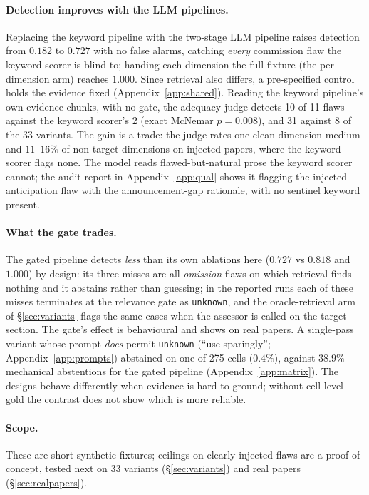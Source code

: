 \paragraph{Detection improves with the LLM pipelines.}
Replacing the keyword pipeline with the two-stage LLM pipeline raises detection
from $0.182$ to $0.727$ with no false alarms, catching \emph{every} commission
flaw the keyword scorer is blind to; handing each dimension the full fixture (the
per-dimension arm) reaches $1.000$. Since retrieval also differs, a
pre-specified control holds the evidence fixed (Appendix~\ref{app:shared}).
Reading the keyword pipeline's own evidence chunks, with no gate, the adequacy
judge detects 10 of 11 flaws against the keyword scorer's 2 (exact McNemar
$p{=}0.008$), and 31 against 8 of the 33 variants. The gain is a trade: the
judge rates one clean dimension medium and $11$--$16\%$ of non-target
dimensions on injected papers, where the keyword scorer flags none. The model reads flawed-but-natural prose the keyword scorer
cannot; the audit report in Appendix~\ref{app:qual} shows it flagging the
injected anticipation flaw with the announcement-gap rationale, with no sentinel
keyword present.

\paragraph{What the gate trades.}
The gated pipeline detects \emph{less} than its own ablations here ($0.727$ vs
$0.818$ and $1.000$) by design: its three misses are all \emph{omission} flaws
on which retrieval finds nothing and it abstains rather than guessing; in the
reported runs each of these misses terminates at the relevance gate as
\texttt{unknown}, and the oracle-retrieval arm of \S\ref{sec:variants} flags
the same cases when the assessor is called on the target section. The gate's effect is behavioural and shows on real papers. A single-pass
variant whose prompt \emph{does} permit \texttt{unknown} (``use sparingly'';
Appendix~\ref{app:prompts}) abstained on one of 275 cells ($0.4\%$), against
$38.9\%$ mechanical abstentions for the gated pipeline
(Appendix~\ref{app:matrix}). The designs behave differently when evidence is
hard to ground; without cell-level gold the contrast does not show which is
more reliable.

\paragraph{Scope.}
These are short synthetic fixtures; ceilings on clearly injected flaws are a
proof-of-concept, tested next on 33 variants (\S\ref{sec:variants}) and real
papers (\S\ref{sec:realpapers}).


